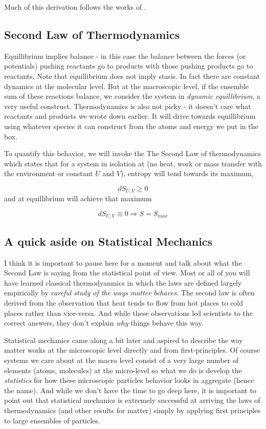 \documentclass[twocolumn]{memoir} %
\begin{document}
Much of this derivation follows the works of \cite{gordon0,gordon1,gordon2,me371,wrobel}.

\subsection{Second Law of Thermodynamics}
Equillibrium implies balance - in this case the balance between the forces (or potentials) pushing reactants go to products
with those pushing products go to reactants.  Note that equillibrium does not imply stasis.  In
fact there are constant dynamics at the molecular level.  But at the macroscopic level, if the ensemble
sum of these reactions balance, we consider the system in \emph{dynamic equillibrium}, a very useful
construct.  Thermodynamics is also not picky - it doesn't care what reactants and products
we wrote down earlier.  It will drive towards equillibrium using whatever species it can construct
from the atoms and energy we put in the box.

To quantify this behavior, we will invoke the The Second Law of thermodynamics which 
states that for a system in isolation at (no heat, work or mass transfer with the environment or
constant $U$ and $V$),
entropy will tend towards its maximum,

\begin{equation*}
    dS_{U,V} \geq 0
\end{equation*}
%
and at equillibrium will achieve that maximum

\begin{equation}
    dS_{U,V} \equiv 0 \Rightarrow S = S_{max}
    \label{eq:min_entropy}
\end{equation}
%

\subsection{A quick aside on Statistical Mechanics}
I think it is important to pause here for a moment and talk about what the Second Law is saying
from the statistical point of view.  Most or all of you will have learned
classical thermodyanmics in which the laws are defined largely empirically by \emph{careful
study of the ways matter behaves}.  The second law is often derived from the observation
that heat tends to flow from hot places to cold places rather than vice-versa.  And while
these observations led scientists to the correct answers, they don't explain \emph{why}
things behave this way.

Statistical mechanics came along a bit later and aspired to describe the way matter works
at the microscopic level directly and from first-principles.  Of course systems we care
about at the macro level consist of a very large number of elements (atoms, molecules)
at the micro-level so what we do is develop the \emph{statistics} for how these microscopic
particles behavior looks in aggregate (hence the name).  And while we don't have the time
to go deep here, it is important to point out that statistical mechanics is extremely successful
at arriving the laws of thermodynamics (and other results for matter) simply by applying
first principles to large ensembles of particles.  
\end{document}
